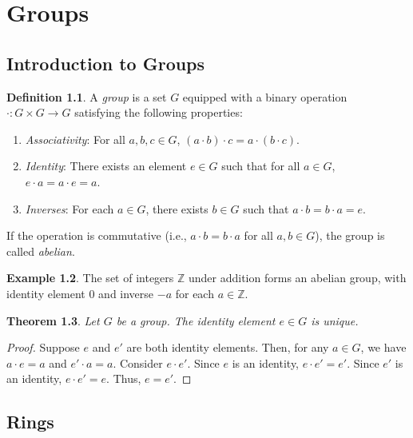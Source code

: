 \documentclass[a4paper,11pt]{book}
\theoremstyle{plain}
\newtheorem{theorem}{Theorem}[section]
\theoremstyle{definition}
\newtheorem{definition}[theorem]{Definition}
\newtheorem{example}[theorem]{Example}
\newcommand{\Z}{\mathbb{Z}}
\begin{document}
\chapter{Groups}

\section{Introduction to Groups}

\begin{definition}
A \emph{group} is a set $G$ equipped with a binary operation $\cdot : G \times G \to G$ satisfying the following properties:
\begin{enumerate}[label=(\roman*)]
    \item \emph{Associativity}: For all $a, b, c \in G$, $(a \cdot b) \cdot c = a \cdot (b \cdot c)$.
    \item \emph{Identity}: There exists an element $e \in G$ such that for all $a \in G$, $e \cdot a = a \cdot e = a$.
    \item \emph{Inverses}: For each $a \in G$, there exists $b \in G$ such that $a \cdot b = b \cdot a = e$.
\end{enumerate}
If the operation is commutative (i.e., $a \cdot b = b \cdot a$ for all $a, b \in G$), the group is called \emph{abelian}.
\end{definition}

\begin{example}
The set of integers $\Z$ under addition forms an abelian group, with identity element $0$ and inverse $-a$ for each $a \in \Z$.
\end{example}

\begin{theorem}
Let $G$ be a group. The identity element $e \in G$ is unique.
\end{theorem}
\begin{proof}
Suppose $e$ and $e'$ are both identity elements. Then, for any $a \in G$, we have $a \cdot e = a$ and $e' \cdot a = a$. Consider $e \cdot e'$. Since $e$ is an identity, $e \cdot e' = e'$. Since $e'$ is an identity, $e \cdot e' = e$. Thus, $e = e'$.
\end{proof}

\section{Rings}
\end{document}
